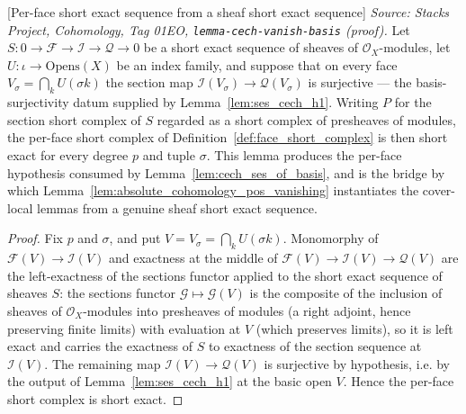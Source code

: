 \begin{lemma}

[Per-face short exact sequence from a sheaf short exact sequence]
  \label{lem:face_ses_of_sheaf_ses}
  \textit{Source: Stacks Project, Cohomology, Tag 01EO,
  \texttt{lemma-cech-vanish-basis} (proof).}
  Let \(S : 0 \to \mathcal{F} \to \mathcal{I} \to \mathcal{Q} \to 0\) be a short exact sequence of
  sheaves of \(\mathcal{O}_X\)-modules, let \(U : \iota \to \mathrm{Opens}(X)\) be an index family,
  and suppose that on every face \(V_\sigma = \bigcap_k U(\sigma k)\) the section map
  \(\mathcal{I}(V_\sigma) \to \mathcal{Q}(V_\sigma)\) is surjective — the basis-surjectivity datum
  supplied by Lemma~\ref{lem:ses_cech_h1}. Writing \(P\) for the section short complex of \(S\)
  regarded as a short complex of presheaves of modules, the per-face short complex of
  Definition~\ref{def:face_short_complex} is then short exact for every degree \(p\) and tuple
  \(\sigma\). This lemma produces the per-face hypothesis consumed by
  Lemma~\ref{lem:cech_ses_of_basis}, and is the bridge by which
  Lemma~\ref{lem:absolute_cohomology_pos_vanishing} instantiates the cover-local lemmas from a
  genuine sheaf short exact sequence.
\end{lemma}
\begin{proof}
  Fix \(p\) and \(\sigma\), and put \(V = V_\sigma = \bigcap_k U(\sigma k)\). Monomorphy of
  \(\mathcal{F}(V) \to \mathcal{I}(V)\) and exactness at the middle of \(\mathcal{F}(V) \to
  \mathcal{I}(V) \to \mathcal{Q}(V)\) are the left-exactness of the sections functor applied to the
  short exact sequence of sheaves \(S\): the sections functor \(\mathcal{G} \mapsto \mathcal{G}(V)\)
  is the composite of the inclusion of sheaves of \(\mathcal{O}_X\)-modules into presheaves of
  modules (a right adjoint, hence preserving finite limits) with evaluation at \(V\) (which
  preserves limits), so it is left exact and carries the exactness of \(S\) to exactness of the
  section sequence at \(\mathcal{I}(V)\). The remaining map \(\mathcal{I}(V) \to \mathcal{Q}(V)\) is
  surjective by hypothesis, i.e. by the output of Lemma~\ref{lem:ses_cech_h1} at the basic open
  \(V\). Hence the per-face short complex is short exact.
\end{proof}

